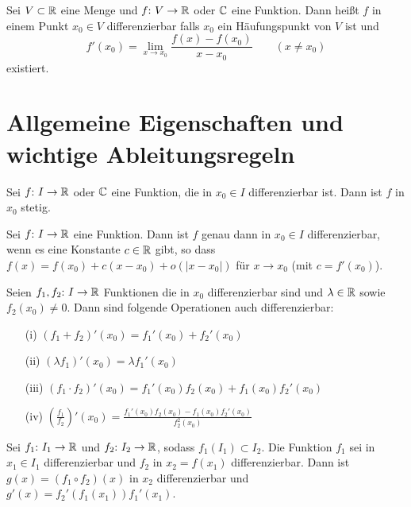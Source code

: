 \begin{frameddefn}
	Sei $V \subset \mathbb{R}$ eine Menge und $f{:}\  V \to \mathbb{R}$ oder $\mathbb{C}$ eine Funktion. Dann heißt $f$ in einem Punkt $x_0 \in V$ differenzierbar falls $x_0$ ein Häufungspunkt von $V$ ist und 
	\[
	f'(x_0) = \lim\limits_{x \to x_0} \frac{f(x) - f(x_0)}{x - x_0} \qquad (x \neq x_0)
	\] 
	existiert.
\end{frameddefn}

\section{Allgemeine Eigenschaften und wichtige Ableitungsregeln}

\begin{framedthm}
	Sei $f{:}\  I \to \mathbb{R}$ oder $\mathbb{C}$ eine Funktion, die in $x_0 \in I$ differenzierbar ist. Dann ist $f$ in $x_0$ stetig.
\end{framedthm}

\begin{framedthm}
	Sei $f{:}\  I \to \mathbb{R}$ eine Funktion. Dann ist $f$ genau dann in $x_0 \in I$ differenzierbar, wenn es eine Konstante $c \in \mathbb{R}$ gibt, so dass $f(x) = f(x_0) + c(x-x_0) + \textit{o}(|x-x_0|)$ für $x \to x_0$ (mit $c=f'(x_0)$).
\end{framedthm}


\begin{framedthm}
	Seien $f_1, f_2 {:}\  I \to \mathbb{R}$ Funktionen die in $x_0$ differenzierbar sind und $\lambda \in \mathbb{R}$ sowie\\ $f_2(x_0) \neq 0$. Dann sind folgende Operationen auch differenzierbar:
	\begin{enumerate}
		\item [(i)] $(f_1 + f_2)'(x_0) = f_1'(x_0) + f_2'(x_0)$
		\item [(ii)] $(\lambda f_1)'(x_0) = \lambda f_1 ' (x_0)$
		\item [(iii)] $(f_1 \cdot f_2)'(x_0) = f_1'(x_0) f_2(x_0) + f_1(x_0) f_2'(x_0)$
		\item [(iv)] $\left(\frac{f_1}{f_2}\right)'(x_0) = \frac{f_1'(x_0) f_2(x_0) - f_1(x_0) f_2'(x_0)}{f_2^2(x_0)}$
	\end{enumerate}
\end{framedthm}


\begin{framedthm}[Kettenregel]
	Sei $f_1{:}\  I_1 \to \mathbb{R}$ und $f_2{:}\  I_2 \to \mathbb{R}$, sodass $f_1(I_1) \subset I_2$. Die Funktion $f_1$ sei in $x_1 \in I_1$ differenzierbar und $f_2$ in $x_2 = f(x_1)$ differenzierbar. Dann ist $g(x) = (f_1 \circ f_2)(x)$ in $x_2$ differenzierbar und $g'(x) = f_2'(f_1(x_1)) f_1'(x_1)$.
\end{framedthm}

